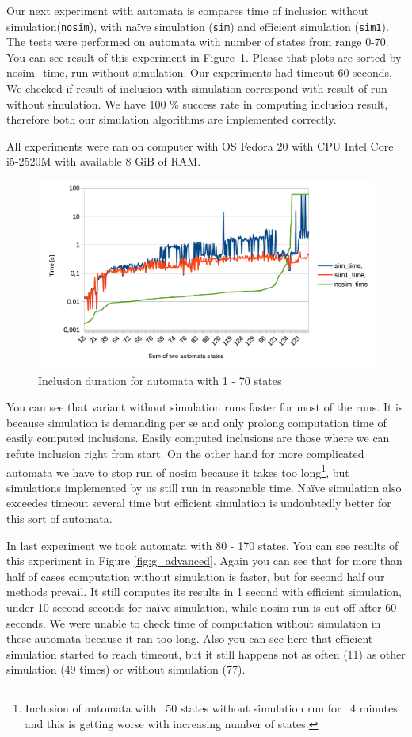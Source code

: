 \documentclass[a4paper, 12pt]{article}
\begin{document}
Our next experiment with automata is compares time of inclusion without simulation(\texttt{nosim}), with na{\"i}ve simulation (\texttt{sim}) and efficient simulation (\texttt{sim1}). The tests were performed on automata with number of states from range 0-70. You can see result of this experiment in Figure~\ref{fig:g2}.  Please that plots are sorted by nosim\_time, run without simulation. Our experiments had timeout 60 seconds. We checked if result of inclusion with simulation correspond with result of run without simulation. We have 100 \% success rate in computing inclusion result, therefore both our simulation algorithms are implemented correctly.

All experiments were ran on computer with OS Fedora 20 with CPU Intel Core i5-2520M with available 8 GiB of RAM.

\begin{figure}[h!]
	\centering
	\includegraphics{g2}
	\caption{Inclusion duration for automata with 1 - 70 states}
	\label{fig:g2}
\end{figure}

You can see that variant without simulation runs faster for most of the runs. It is because simulation is demanding per se and only prolong computation time of easily computed inclusions. Easily computed inclusions are those where we can refute inclusion right from start. On the other hand for more complicated automata we have to stop run of nosim because it takes too long\footnote{Inclusion of automata with ~50 states without simulation run for ~4 minutes and this is getting worse with increasing number of states.}, but simulations implemented by us still run in reasonable time. Na{\"i}ve simulation also exceedes timeout several time but efficient simulation is undoubtedly better for this sort of automata.

In last experiment we took automata with 80 - 170 states. You can see results of this experiment in Figure \ref{fig:g_advanced}. Again you can see that for more than half of cases computation without simulation is faster, but for second half our methods  prevail. It still computes its results in 1 second with efficient simulation, under 10 second seconds for na{\"i}ve simulation, while nosim run is cut off after 60 seconds. We were unable to check time of computation without simulation in these automata because it ran too long. Also you can see here that efficient simulation started to reach timeout, but it still happens not as often (11) as other simulation (49 times) or without simulation (77).
\end{document}
